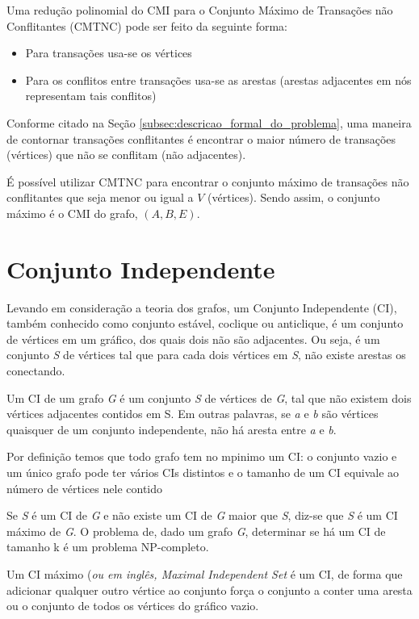 \documentclass[conference]{IEEEtran}
\begin{document}
Uma redução polinomial do CMI para o Conjunto Máximo de Transações não Conflitantes (CMTNC) pode ser feito da seguinte forma:

\begin{itemize}
    \item Para transações usa-se os vértices
    \item Para os conflitos entre transações usa-se as arestas (arestas adjacentes em nós representam tais conflitos)
\end{itemize}

Conforme citado na Seção \ref{subsec:descricao_formal_do_problema}, uma maneira de contornar transações conflitantes é encontrar o maior número de transações (vértices) que não se conflitam (não adjacentes).

É possível utilizar CMTNC para encontrar o conjunto máximo de transações não conflitantes que seja menor ou igual a $V$ (vértices). Sendo assim, o conjunto máximo é o CMI do grafo, $(A, B, E)$.

\section{Conjunto Independente}\label{CI}

Levando em consideração a teoria dos grafos, um Conjunto Independente (CI), também conhecido como conjunto estável, coclique ou anticlique, é um conjunto de vértices em um gráfico, dos quais dois não são adjacentes. Ou seja, é um conjunto \emph{S} de vértices tal que para cada dois vértices em \emph{S}, não existe arestas os conectando. 

Um CI de um grafo \emph{G} é um conjunto \emph{S} de vértices de \emph{G}, tal que não existem dois vértices adjacentes contidos em S. Em outras palavras, se \emph{a} e \emph{b} são vértices quaisquer de um conjunto independente, não há aresta entre \emph{a} e \emph{b}.

Por definição temos que todo grafo tem no mpinimo um CI: o conjunto vazio e um único grafo pode ter vários CIs distintos e o tamanho de um CI equivale ao número de vértices nele contido

Se \emph{S} é um CI de \emph{G} e não existe um CI de \emph{G} maior que \emph{S}, diz-se que \emph{S} é um CI máximo de \emph{G}. O problema de, dado um grafo \emph{G}, determinar se há um CI de tamanho k é um problema NP-completo.

Um CI máximo (\emph{ou  em inglês, Maximal Independent Set} é um CI, de forma que adicionar qualquer outro vértice ao conjunto força o conjunto a conter uma aresta ou o conjunto de todos os vértices do gráfico vazio.
\end{document}
